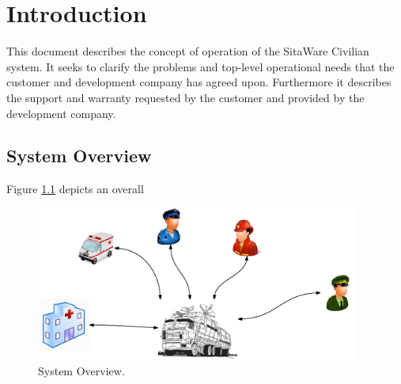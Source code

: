 \chapter{Introduction}
This document describes the concept of operation of the SitaWare Civilian system. It seeks to clarify the problems and top-level operational needs that the customer and development company has agreed upon. Furthermore it describes the support and warranty requested by the customer and provided by the development company. 

\section{System Overview}
Figure \ref{fig:system_overview} depicts an overall 




\begin{figure}[H]
\centering
\includegraphics[width=0.95\textwidth]
{billeder/system_overview.pdf}
\caption{System Overview.}
\label{fig:system_overview}
\end{figure}